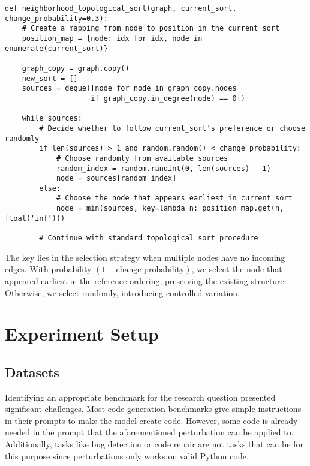 \documentclass[%
thesis=student,%
coverpage=false,%
titlepage=false,%
headmarks=true, %
english,%
font=libertine, %
math=newpxtx, %
BCOR=5mm,%
coverBCOR=11mm%
]{tum-templates/book/tumbook}
\begin{document}
\newpage
\begin{lstlisting}[style=pythonstyle, caption={Neighborhood topological sort that gets as an input the current topological sort and the probability of varying from that}]
def neighborhood_topological_sort(graph, current_sort, change_probability=0.3):
    # Create a mapping from node to position in the current sort
    position_map = {node: idx for idx, node in enumerate(current_sort)}
    
    graph_copy = graph.copy()
    new_sort = []
    sources = deque([node for node in graph_copy.nodes 
                    if graph_copy.in_degree(node) == 0])
    
    while sources:
        # Decide whether to follow current_sort's preference or choose randomly
        if len(sources) > 1 and random.random() < change_probability:
            # Choose randomly from available sources
            random_index = random.randint(0, len(sources) - 1)
            node = sources[random_index]
        else:
            # Choose the node that appears earliest in current_sort
            node = min(sources, key=lambda n: position_map.get(n, float('inf')))
        
        # Continue with standard topological sort procedure
\end{lstlisting}
The key lies in the selection strategy when multiple nodes have no incoming edges. With probability $(1 - \text{change\_probability})$, we select the node that appeared earliest in the reference ordering, preserving the existing structure. Otherwise, we select randomly, introducing controlled variation.




\chapter{Experiment Setup}
\label{ch:Experiment_Setup}
\section{Datasets}

Identifying an appropriate benchmark for the research question presented significant challenges. Most code generation benchmarks give simple instructions in their prompts to make the model create code. However, some code is already needed in the prompt that the aforementioned perturbation can be applied to. Additionally, tasks like bug detection or code repair are not tasks that can be for this purpose since perturbations only works on valid Python code. \\
\end{document}
